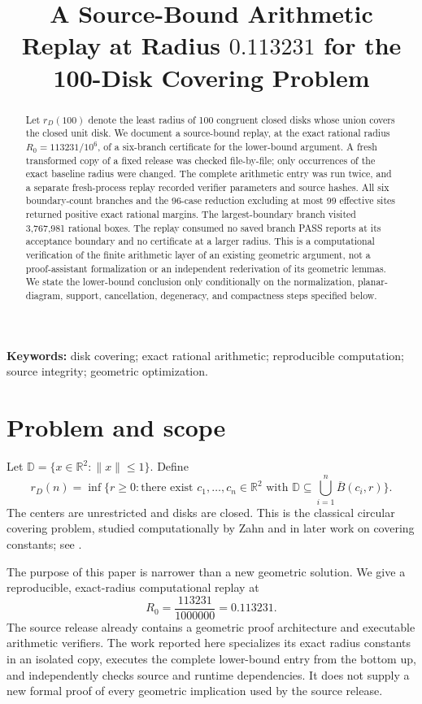 \documentclass[11pt]{article}
\title{A Source-Bound Arithmetic Replay at Radius $0.113231$ for the 100-Disk Covering Problem}
\date{}
\newcommand{\D}{\mathbb D}
\newcommand{\R}{\mathbb R}
\newcommand{\rd}{r_D}
\newcommand{\cR}{R_0}
\begin{document}
\maketitle
\begin{abstract}
Let $\rd(100)$ denote the least radius of 100 congruent closed disks whose union covers the closed unit disk. We document a source-bound replay, at the exact rational radius $\cR=113231/10^6$, of a six-branch certificate for the lower-bound argument. A fresh transformed copy of a fixed release was checked file-by-file; only occurrences of the exact baseline radius were changed. The complete arithmetic entry was run twice, and a separate fresh-process replay recorded verifier parameters and source hashes. All six boundary-count branches and the 96-case reduction excluding at most 99 effective sites returned positive exact rational margins. The largest-boundary branch visited 3,767,981 rational boxes. The replay consumed no saved branch PASS reports at its acceptance boundary and no certificate at a larger radius. This is a computational verification of the finite arithmetic layer of an existing geometric argument, not a proof-assistant formalization or an independent rederivation of its geometric lemmas. We state the lower-bound conclusion only conditionally on the normalization, planar-diagram, support, cancellation, degeneracy, and compactness steps specified below.
\end{abstract}

\noindent\textbf{Keywords:} disk covering; exact rational arithmetic; reproducible computation; source integrity; geometric optimization.

\section{Problem and scope}
Let $\D=\{x\in\R^2:\|x\|\leq 1\}$. Define
\[
 \rd(n)=\inf\{r\geq0:\text{there exist }c_1,\ldots,c_n\in\R^2\text{ with }\D\subseteq\bigcup_{i=1}^n\overline B(c_i,r)\}.
\]
The centers are unrestricted and disks are closed. This is the classical circular covering problem, studied computationally by Zahn and in later work on covering constants; see \cite{Zahn1962,Kershner1939,FejesToth2005}.

The purpose of this paper is narrower than a new geometric solution. We give a reproducible, exact-radius computational replay at
\[
 \cR=\frac{113231}{1000000}=0.113231.
\]
The source release already contains a geometric proof architecture and executable arithmetic verifiers. The work reported here specializes its exact radius constants in an isolated copy, executes the complete lower-bound entry from the bottom up, and independently checks source and runtime dependencies. It does not supply a new formal proof of every geometric implication used by the source release.
\end{document}

